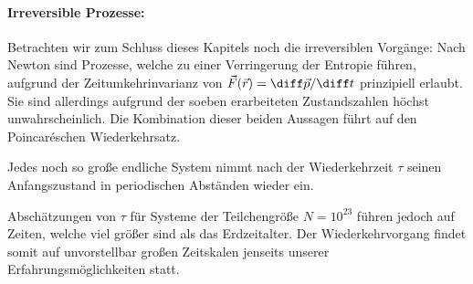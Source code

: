 \paragraph*{Irreversible Prozesse:} Betrachten wir zum Schluss dieses Kapitels noch die irreversiblen Vorgänge:
Nach Newton sind Prozesse, welche zu einer Verringerung der Entropie führen, aufgrund der Zeitumkehrinvarianz von $\vec{F}(\vec{r})=\diff\vec{p}/\diff t$ prinzipiell erlaubt. Sie sind allerdings aufgrund der soeben erarbeiteten Zustandszahlen höchst unwahrscheinlich. Die Kombination dieser beiden Aussagen führt auf den Poincaréschen Wiederkehrsatz.
\begin{formal}
     Jedes noch so große endliche System nimmt nach der Wiederkehrzeit $\tau$ seinen Anfangszustand in periodischen Abständen wieder ein. 
\end{formal}
Abschätzungen von $\tau$ für Systeme der Teilchengröße $N=10^{23}$ führen jedoch auf Zeiten, welche viel größer sind als das Erdzeitalter. Der Wiederkehrvorgang findet somit auf unvorstellbar großen Zeitskalen jenseits unserer Erfahrungsmöglichkeiten statt.
